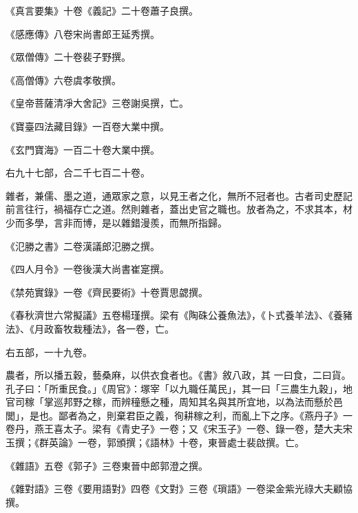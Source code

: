 \begin{pinyinscope}
 《真言要集》十卷《義記》二十卷蕭子良撰。



 《感應傳》八卷宋尚書郎王延秀撰。



 《眾僧傳》二十卷裴子野撰。



 《高僧傳》六卷虞孝敬撰。



 《皇帝菩薩清凈大舍記》三卷謝吳撰，亡。



 《寶臺四法藏目錄》一百卷大業中撰。



 《玄門寶海》一百二十卷大業中撰。



 右九十七部，合二千七百二十卷。



 雜者，兼儒、墨之道，通眾家之意，以見王者之化，無所不冠者也。古者司史歷記前言往行，禍福存亡之道。然則雜者，蓋出史官之職也。放者為之，不求其本，材少而多學，言非而博，是以雜錯漫羨，而無所指歸。



 《氾勝之書》二卷漢議郎氾勝之撰。



 《四人月令》一卷後漢大尚書崔寔撰。



 《禁苑實錄》一卷《齊民要術》十卷賈思勰撰。



 《春秋濟世六常擬議》五卷楊瑾撰。梁有《陶硃公養魚法》，《卜式養羊法》、《養豬法》、《月政畜牧栽種法》，各一卷，亡。



 右五部，一十九卷。



 農者，所以播五穀，藝桑麻，以供衣食者也。《書》敘八政，其
 一曰食，二曰貨。孔子曰：「所重民食。」《周官》：塚宰「以九職任萬民」，其一曰「三農生九穀」，地官司稼「掌巡邦野之稼，而辨穜懸之種，周知其名與其所宜地，以為法而懸於邑閭」，是也。鄙者為之，則棄君臣之義，徇耕稼之利，而亂上下之序。《燕丹子》一卷丹，燕王喜太子。梁有《青史子》一卷；又《宋玉子》一卷、錄一卷，楚大夫宋玉撰；《群英論》一卷，郭頒撰；《語林》十卷，東晉處士裴啟撰。亡。



 《雜語》五卷《郭子》三卷東晉中郎郭澄之撰。



 《雜對語》三卷《要用語對》四卷《文對》三卷《瑣語》一卷梁金紫光祿大夫顧協撰。




\end{pinyinscope}
